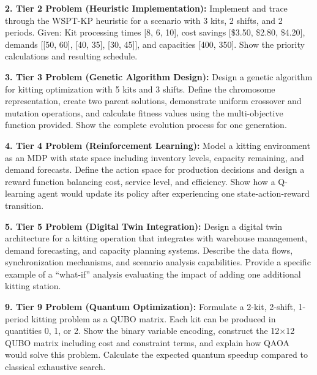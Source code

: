 \documentclass{article}
\begin{document}
\textbf{2. Tier 2 Problem (Heuristic Implementation):}
Implement and trace through the WSPT-KP heuristic for a scenario with 3 kits, 2 shifts, and 2 periods. Given: Kit processing times [8, 6, 10], cost savings [\$3.50, \$2.80, \$4.20], demands [[50, 60], [40, 35], [30, 45]], and capacities [400, 350]. Show the priority calculations and resulting schedule.

\textbf{3. Tier 3 Problem (Genetic Algorithm Design):}
Design a genetic algorithm for kitting optimization with 5 kits and 3 shifts. Define the chromosome representation, create two parent solutions, demonstrate uniform crossover and mutation operations, and calculate fitness values using the multi-objective function provided. Show the complete evolution process for one generation.

\textbf{4. Tier 4 Problem (Reinforcement Learning):}
Model a kitting environment as an MDP with state space including inventory levels, capacity remaining, and demand forecasts. Define the action space for production decisions and design a reward function balancing cost, service level, and efficiency. Show how a Q-learning agent would update its policy after experiencing one state-action-reward transition.

\textbf{5. Tier 5 Problem (Digital Twin Integration):}
Design a digital twin architecture for a kitting operation that integrates with warehouse management, demand forecasting, and capacity planning systems. Describe the data flows, synchronization mechanisms, and scenario analysis capabilities. Provide a specific example of a ``what-if'' analysis evaluating the impact of adding one additional kitting station.

\textbf{9. Tier 9 Problem (Quantum Optimization):}
Formulate a 2-kit, 2-shift, 1-period kitting problem as a QUBO matrix. Each kit can be produced in quantities 0, 1, or 2. Show the binary variable encoding, construct the 12×12 QUBO matrix including cost and constraint terms, and explain how QAOA would solve this problem. Calculate the expected quantum speedup compared to classical exhaustive search.
\end{document}
